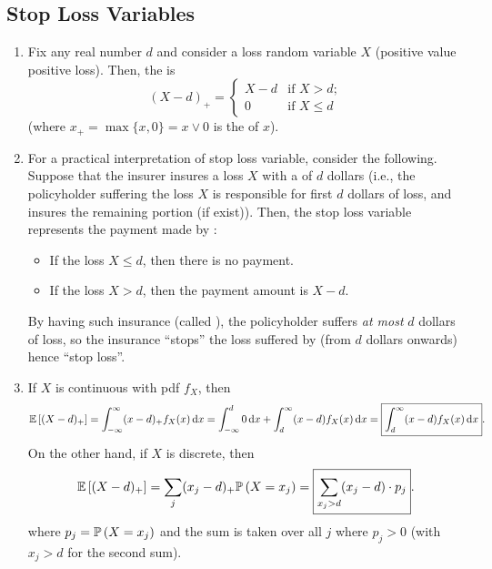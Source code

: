 \subsection{Stop Loss Variables}
\begin{enumerate}
\item Fix any real number \(d\) and consider a loss  random
variable \(X\) (positive value  positive loss).  Then, the
 is 
\[
(X-d)_{+}=\begin{cases}
X-d&\text{if }X> d;\\
0&\text{if }X\le d
\end{cases}
\]
(where \(x_{+}=\max\{x,0\}=x\vee 0\) is the  of \(x\)).

\item For a practical interpretation of stop loss variable, consider the
following. Suppose that the insurer  insures a loss \(X\) with
a  of \(d\) dollars (i.e., the policyholder 
suffering the loss \(X\) is responsible for first \(d\) dollars of loss, and
 insures the remaining portion (if exist)). Then, the stop
loss variable represents the payment made by :
\begin{itemize}
\item If the loss \(X\le d\), then there is no payment.
\item If the loss \(X>d\), then the payment amount is \(X-d\).
\end{itemize}
\begin{note}
By having such insurance (called ), the policyholder
 suffers \emph{at most} \(d\) dollars of loss, so the insurance
``stops'' the loss suffered by  (from \(d\) dollars onwards)
 hence ``stop loss''.
\end{note}

\item \label{it:stop-loss-direct-exp-fmlas}
If \(X\) is continuous with pdf \(f_X\), then
\[
\mathbb{E}\left[(X-d)_{+}\right]=\int_{-\infty}^{\infty}(x-d)_{+}f_X(x)\dd{x}
=\int_{-\infty}^{d}0\dd{x}+\int_{d}^{\infty}(x-d)f_X(x)\dd{x}
=\boxed{\int_{d}^{\infty}(x-d)f_X(x)\dd{x}}.
\]
On the other hand, if \(X\) is discrete, then
\[
\mathbb{E}\left[(X-d)_{+}\right]=\sum_{j}^{}(x_j-d)_{+}\mathbb{P}\left(X=x_j\right)
=\boxed{\sum_{x_j>d}^{}(x_j-d)\cdot p_j}.
\]
where \(p_j=\mathbb{P}\left(X=x_j\right)\) and the sum is taken over all \(j\) where \(p_j>0\)
(with \(x_j>d\) for the second sum).


\end{enumerate}
